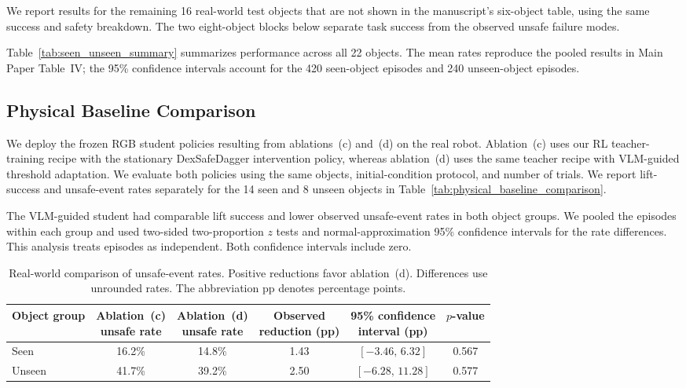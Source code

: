 We report results for the remaining 16 real-world test objects that are not
shown in the manuscript's six-object table, using the same success and safety
breakdown. The two eight-object blocks below separate task success from the
observed unsafe failure modes.



Table~\ref{tab:seen_unseen_summary} summarizes performance across all 22
objects. The mean rates reproduce the pooled results in Main Paper Table~IV;
the 95\% confidence intervals account for the 420 seen-object episodes and 240
unseen-object episodes.




\subsection{Physical Baseline Comparison}
We deploy the frozen RGB student policies resulting from ablations~(c) and~(d)
on the real robot. Ablation~(c) uses our RL teacher-training recipe with the stationary
DexSafeDagger intervention policy, whereas ablation~(d) uses the same teacher
recipe with VLM-guided threshold adaptation. We evaluate both policies
using the same objects, initial-condition protocol, and number of trials. We
report lift-success and unsafe-event rates separately for the 14 seen and 8
unseen objects in Table~\ref{tab:physical_baseline_comparison}.



The VLM-guided student had comparable lift success and lower observed
unsafe-event rates in both object groups. We pooled the episodes within
each group and used two-sided two-proportion $z$ tests and
normal-approximation 95\% confidence intervals for the rate differences.
This analysis treats episodes as independent. Both confidence intervals
include zero.

\begin{table}[H]
\centering
\footnotesize
\caption{Real-world comparison of unsafe-event rates. Positive reductions
favor ablation~(d). Differences use unrounded rates.
The abbreviation pp denotes percentage points.}
\label{tab:physical_baseline_confidence_intervals}
\begin{tabular}{lccccc}
\toprule
Object group & \makecell{Ablation~(c)\\unsafe rate} &
\makecell{Ablation~(d)\\unsafe rate} & \makecell{Observed\\reduction (pp)} &
\makecell{95\% confidence\\interval (pp)} & $p$-value \\
\midrule
Seen & 16.2\% & 14.8\% & 1.43 & $[-3.46,\,6.32]$ & 0.567 \\
Unseen & 41.7\% & 39.2\% & 2.50 & $[-6.28,\,11.28]$ & 0.577 \\
\bottomrule
\end{tabular}
\end{table}

